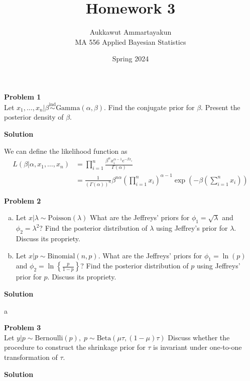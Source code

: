 \documentclass{article}
\title{Homework 3}
\author{Aukkawut Ammartayakun\\MA 556 Applied Bayesian Statistics}
\date{Spring 2024}
\newcommand{\ind}{\stackrel{\text{ind}}{\sim}}
\newcommand{\nx}{x_1,\dots,x_n}
\newcommand{\Done}[2]{\text{#1}\left({#2}\right)}
\newcommand{\Dtwo}[3]{\text{#1}\left({#2},{#3}\right)}
\begin{document}
\maketitle
\noindent
\Large{\textbf{Problem 1}}\normalsize
\\


Let $\nx|\beta \ind \Dtwo{Gamma}{\alpha}{\beta}$. Find the conjugate prior for $\beta$. Present the posterior density of $\beta$.

\vspace{\baselineskip}
\noindent
\textbf{Solution}

We can define the likelihood function as
\begin{align*}L(\beta|\alpha,\nx) &= \prod_{i=1}^n \frac{\beta^{\alpha}x_i^{\alpha-1}e^{-\beta x_i}}{\Gamma(\alpha)}\\
&= \frac{1}{\left(\Gamma(\alpha)\right)^n}\beta^{n\alpha}\left(\prod_{i=1}^n x_i\right)^{\alpha - 1} \exp\left(-\beta\left(\sum_{i=1}^n x_i\right)\right)
\end{align*}
\vspace{\baselineskip}

\noindent
\Large{\textbf{Problem 2}}\normalsize
\\
\begin{enumerate}[(a)]
\item Let $x|\lambda \sim \Done{Poisson}{\lambda}$ What are the Jeffreys’ priors for $\phi_1 = \sqrt{\lambda}$ and $\phi_2 = \lambda^2$? Find the posterior distribution of $\lambda$ using Jeffrey’s prior for $\lambda$. Discuss its propriety.
\item Let $x|p \sim \Dtwo{Binomial}{n}{p}$. What are the Jeffreys’ priors for $\phi_1 = \ln(p)$ and $\phi_2 = \ln\left\{\frac{p}{1-p}\right\}$? Find the posterior distribution of $p$ using Jeffreys’ prior for $p$. Discuss its propriety.
\end{enumerate}


\vspace{\baselineskip}
\noindent
\textbf{Solution}

a


\noindent
\Large{\textbf{Problem 3}}\normalsize
\\

Let $y|p \sim\Done{Bernoulli}{p},\; p \sim \Dtwo{Beta}{\mu \tau}{(1-\mu)\tau}$ Discuss whether the procedure to construct the shrinkage prior for $\tau$ is invariant under one-to-one transformation of $\tau$.

\vspace{\baselineskip}
\noindent
\textbf{Solution}
\end{document}
